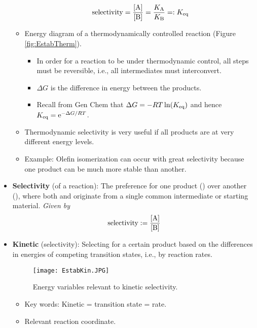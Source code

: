 \documentclass[../notes.tex]{subfiles}
\begin{document}
\begin{itemize}
\begin{itemize}
        \begin{equation*}
            \text{selectivity} = \frac{\cnc{A}}{\cnc{B}}
            = \frac{K_{\ce{A}}}{K_{\ce{B}}}
            =: \Keq
        \end{equation*}
        \item Energy diagram of a thermodynamically controlled reaction (Figure \ref{fig:EstabTherm}).
        \begin{itemize}
            \item In order for a reaction to be under thermodynamic control, all steps must be reversible, i.e., all intermediates must interconvert.
            \item $\Delta G$ is the difference in energy between the products.
            \item Recall from Gen Chem that $\Delta G=-RT\ln(\Keq)$ and hence $\Keq=\e[-\Delta G/RT]$.
        \end{itemize}
        \item Thermodynamic selectivity is very useful if all products are at very different energy levels.
        \item Example: Olefin isomerization can occur with great selectivity because one product can be much more stable than another.
    \end{itemize}
    \item \textbf{Selectivity} (of a reaction): The preference for one product () over another (), where both  and  originate from a single common intermediate or starting material. \emph{Given by}
    \begin{equation*}
        \text{selectivity} := \frac{\cnc{A}}{\cnc{B}}
    \end{equation*}
    \item \textbf{Kinetic} (selectivity): Selecting for a certain product based on the differences in energies of competing transition states, i.e., by reaction rates.
    \begin{figure}[H]
        \centering
        \texttt{[image: EstabKin.JPG]}
        \caption{Energy variables relevant to kinetic selectivity.}
        \label{fig:EstabKin}
    \end{figure}
    \begin{itemize}
        \item Key words: Kinetic = transition state = rate.
        \item Relevant reaction coordinate.
        \begin{equation*}

\end{equation*}
\end{itemize}
\end{itemize}
\end{document}
